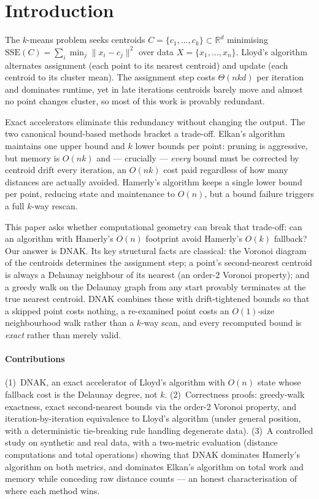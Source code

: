 \documentclass[review,12pt]{elsarticle}
\begin{document}
\section{Introduction}
\label{sec:intro}

The $k$-means problem seeks centroids $C=\{c_1,\dots,c_k\}\subset
\mathbb{R}^d$ minimising $\mathrm{SSE}(C)=\sum_i \min_j \lVert
x_i-c_j\rVert^2$ over data $X=\{x_1,\dots,x_n\}$. Lloyd's algorithm \cite{lloyd} alternates assignment (each point to its nearest centroid) and update
(each centroid to its cluster mean). The assignment step costs
$\Theta(nkd)$ per iteration and dominates runtime, yet in late
iterations centroids barely move and almost no point changes cluster,
so most of this work is provably redundant.

Exact accelerators eliminate this redundancy without changing the
output. The two canonical bound-based methods bracket a trade-off.
Elkan's algorithm maintains one upper bound and $k$ lower bounds per
point: pruning is aggressive, but memory is $O(nk)$ and --- crucially
--- \emph{every} bound must be corrected by centroid drift every
iteration, an $O(nk)$ cost paid regardless of how many distances are
actually avoided. Hamerly's algorithm keeps a single lower bound per
point, reducing state and maintenance to $O(n)$, but a bound failure
triggers a full $k$-way rescan.

This paper asks whether computational geometry can break that
trade-off: can an algorithm with Hamerly's $O(n)$ footprint avoid
Hamerly's $O(k)$ fallback? Our answer is DNAK. Its key structural
facts are classical: the Voronoi diagram of the centroids determines
the assignment step; a point's second-nearest centroid is always a
Delaunay neighbour of its nearest (an order-2 Voronoi property); and a
greedy walk on the Delaunay graph from any start provably terminates
at the true nearest centroid. DNAK combines these with drift-tightened
bounds so that a skipped point costs nothing, a re-examined point
costs an $O(1)$-size neighbourhood walk rather than a $k$-way scan,
and every recomputed bound is \emph{exact} rather than merely valid.

\paragraph{Contributions}
(1)~DNAK, an exact accelerator of Lloyd's algorithm with $O(n)$ state
whose fallback cost is the Delaunay degree, not $k$.
(2)~Correctness proofs: greedy-walk exactness, exact second-nearest
bounds via the order-2 Voronoi property, and iteration-by-iteration
equivalence to Lloyd's algorithm (under general position, with a
deterministic tie-breaking rule handling degenerate data).
(3)~A controlled study on synthetic and real data, with a two-metric
evaluation (distance computations and total operations) showing that
DNAK dominates Hamerly's algorithm on both metrics, and dominates
Elkan's algorithm on total work and memory while conceding raw
distance counts --- an honest characterisation of where each method
wins.
\end{document}
